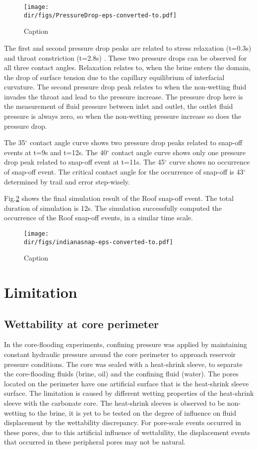 \begin{figure}
    \centering
    \texttt{[image: \\dir/figs/PressureDrop-eps-converted-to.pdf]}
    \caption{Caption}   
    \label{pressuredrop}
\end{figure}

The first and second pressure drop peaks are related to stress relaxation (t=0.3s) and throat constriction (t=2.8s) . These two pressure drops can be observed for all three contact angles. Relaxation relates to, when the brine enters the domain, the drop of surface tension due to the capillary equilibrium of interfacial curvature. The second pressure drop peak relates to when the non-wetting fluid invades the throat and lead to the pressure increase. The pressure drop here is the measurement of fluid pressure between inlet and outlet, the outlet fluid pressure is always zero, so when the non-wetting pressure increase so does the pressure drop.

The 35$^\circ$ contact angle curve shows two pressure drop peaks related to snap-off events at t=9s and t=12s. The 40$^\circ$ contact angle curve shows only one pressure drop peak related to snap-off event at t=11s. The 45$^\circ$ curve shows no occurrence of snap-off event. The critical contact angle for the occurrence of snap-off is 43$^\circ$ determined by trail and error step-wisely. 

Fig.\ref{indianasnap} shows the final simulation result of the Roof snap-off event. The total duration of simulation is 12s. The simulation successfully computed the occurrence of the Roof snap-off events, in a similar time scale.

\begin{figure}
    \centering
    \texttt{[image: \\dir/figs/indianasnap-eps-converted-to.pdf]}
    \caption{Caption}   
    \label{indianasnap}
\end{figure}


\section{Limitation}
\subsection{Wettability at core perimeter}
In the core-flooding experiments, confining pressure was applied by maintaining constant hydraulic pressure around the core perimeter to approach reservoir pressure conditions. The core was sealed with a heat-shrink sleeve, to separate the core-flooding fluids (brine, oil) and the confining fluid (water). The pores located on the perimeter have one artificial surface that is the heat-shrink sleeve surface. The limitation is caused by different wetting properties of the heat-shrink sleeve with the carbonate core. The heat-shrink sleeves is observed to be non-wetting to the brine, it is yet to be tested on the degree of influence on fluid displacement by the wettability discrepancy. For pore-scale events occurred in these pores, due to this artificial influence of wettability, the displacement events that occurred in these peripheral pores may not be natural. 

